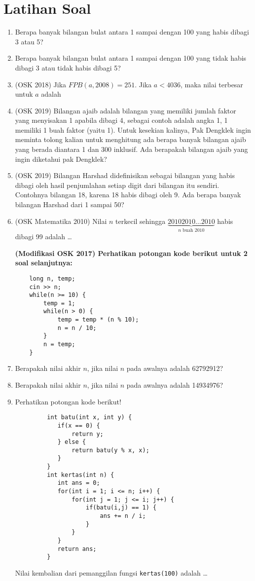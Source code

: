     \section{Latihan Soal}
	\begin{enumerate}	
	\item Berapa banyak bilangan bulat antara 1 sampai dengan 100 yang habis dibagi 3 atau 5?
	\item Berapa banyak bilangan bulat antara 1 sampai dengan 100 yang tidak habis dibagi 3 atau tidak 
	habis dibagi 5?
	\item (OSK 2018) Jika $FPB(a,2008)=251$. Jika $a < 4036$, maka nilai terbesar untuk $a$ adalah
	\item (OSK 2019)  Bilangan ajaib adalah bilangan yang memiliki jumlah faktor yang menyisakan 1 apabila dibagi 4, sebagai 
	contoh adalah angka 1, 1 memiliki 1 buah faktor (yaitu 1). Untuk kesekian kalinya, Pak Dengklek ingin 
	meminta tolong kalian untuk menghitung ada berapa banyak bilangan ajaib yang berada diantara 1 dan 
	300 inklusif. Ada berapakah bilangan ajaib yang ingin diketahui pak Dengklek? 
	\item (OSK 2019) Bilangan Harshad didefinisikan sebagai bilangan yang habis dibagi oleh hasil penjumlahan setiap digit 
	dari bilangan itu sendiri. Contohnya bilangan 18, karena 18 habis dibagi oleh 9. Ada berapa banyak 
	bilangan Harshad dari 1 sampai 50? 
	\item (OSK Matematika 2010) Nilai $n$ terkecil sehingga $\underbrace{20102010\dots2010}_\text{$n$ buah 2010}$ habis dibagi 99 adalah \dots
	
	\textbf{(Modifikasi OSK 2017) Perhatikan potongan kode berikut untuk 2 soal selanjutnya:}
	\begin{lstlisting}
	long n, temp;
	cin >> n;
	while(n >= 10) {
		temp = 1;
		while(n > 0) {
			temp = temp * (n % 10);
			n = n / 10;
		}
		n = temp;
	}
	\end{lstlisting}
	\item Berapakah nilai akhir $n$, jika nilai $n$ pada awalnya adalah 62792912?
	\item Berapakah nilai akhir $n$, jika nilai $n$ pada awalnya adalah 14934976?
	
	\item Perhatikan potongan kode berikut!
		 \begin{lstlisting}
		 int batu(int x, int y) {
		 	if(x == 0) {
		 		return y;
		 	} else {
		 		return batu(y % x, x);
		 	}
		 }
		 int kertas(int n) {
		 	int ans = 0;
		 	for(int i = 1; i <= n; i++) {
		 		for(int j = 1; j <= i; j++) {
		 			if(batu(i,j) == 1) {
		 				ans += n / i;
		 			}
		 		}
		 	}
		 	return ans;
		 }
		 \end{lstlisting}
		 Nilai  kembalian dari pemanggilan fungsi \verb*|kertas(100)| adalah \dots
		 

\end{enumerate}
